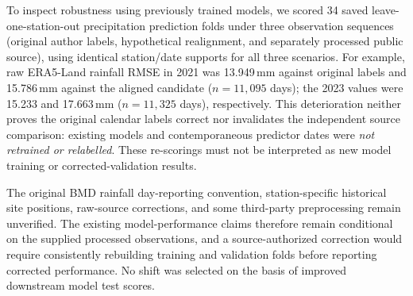To inspect robustness using previously trained models, we scored 34 saved
leave-one-station-out precipitation prediction folds under three observation
sequences (original author labels, hypothetical realignment, and separately
processed public source), using identical station/date supports for all three
scenarios. For example, raw ERA5-Land rainfall RMSE in 2021 was 13.949\,mm
against original labels and 15.786\,mm against the aligned candidate
($n=11{,}095$ days); the 2023 values were 15.233 and 17.663\,mm
($n=11{,}325$ days), respectively. This deterioration neither proves the
original calendar labels correct nor invalidates the independent source
comparison: existing models and contemporaneous predictor dates were
\emph{not retrained or relabelled}. These re-scorings must not be interpreted
as new model training or corrected-validation results.

The original BMD rainfall day-reporting convention, station-specific historical
site positions, raw-source corrections, and some third-party preprocessing
remain unverified. The existing model-performance claims therefore remain
conditional on the supplied processed observations, and a source-authorized
correction would require consistently rebuilding training and validation
folds before reporting corrected performance. No shift was selected on the
basis of improved downstream model test scores.
